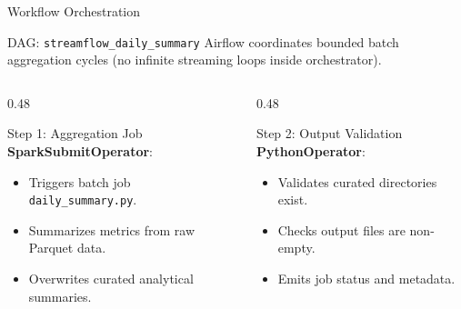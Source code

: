 \documentclass[10pt]{beamer}
\begin{document}
\begin{frame}{Workflow Orchestration}
  \begin{block}{DAG: \texttt{streamflow\_daily\_summary}}
    Airflow coordinates bounded batch aggregation cycles (no infinite streaming loops inside orchestrator).
  \end{block}

  \begin{columns}[T]
    \begin{column}{0.48\textwidth}
      \begin{block}{Step 1: Aggregation Job}
        \textbf{SparkSubmitOperator}:
        \begin{itemize}
          \item Triggers batch job \texttt{daily\_summary.py}.
          \item Summarizes metrics from raw Parquet data.
          \item Overwrites curated analytical summaries.
        \end{itemize}
      \end{block}
    \end{column}
    
    \hfill
    
    \begin{column}{0.48\textwidth}
      \begin{block}{Step 2: Output Validation}
        \textbf{PythonOperator}:
        \begin{itemize}
          \item Validates curated directories exist.
          \item Checks output files are non-empty.
          \item Emits job status and metadata.
        \end{itemize}
      \end{block}
    \end{column}
  \end{columns}
\end{frame}
\end{document}

